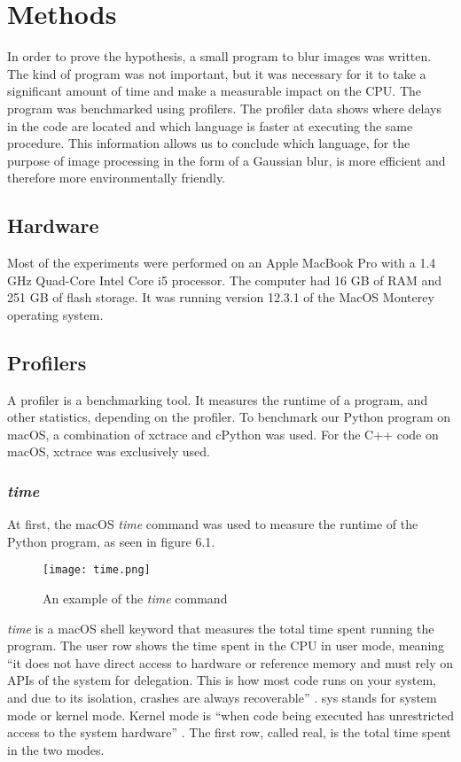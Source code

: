 \chapter{Methods}
In order to prove the hypothesis, a small program to blur images was written. The kind of program was not important, but it was necessary for it to take a significant amount of time and make a measurable impact on the CPU.
The program was benchmarked using profilers. The profiler data shows where delays in the code are located and which language is faster at executing the same procedure. This information allows us to conclude which language, for the purpose of image processing in the form of a Gaussian blur, is more efficient and therefore more environmentally friendly.

\section{Hardware}
Most of the experiments were performed on an Apple MacBook Pro with a 1.4 GHz Quad-Core Intel Core i5 processor. The computer had 16 GB of RAM and 251 GB of flash storage. It was running version 12.3.1 of the MacOS Monterey operating system.

\section{Profilers}
A profiler is a benchmarking tool. It measures the runtime of a program, and other statistics, depending on the profiler. To benchmark our Python program on macOS, a combination of xctrace and cPython was used. For the C++ code on macOS, xctrace was exclusively used.

\subsection{\textit{time}}
At first, the macOS \textit{time} command was used to measure the runtime of the Python program, as seen in figure 6.1.

\begin{figure}[htbp]
	\centering
	\texttt{[image: time.png]}
	\caption{An example of the \textit{time} command}
	\label{figure:time}
\end{figure}

\textit{time} is a macOS shell keyword that measures the total time spent running the program. The user row shows the time spent in the CPU in user mode, meaning “it does not have direct access to hardware or reference memory and must rely on APIs of the system for delegation. This is how most code runs on your system, and due to its isolation, crashes are always recoverable” \cite{time}. sys stands for system mode or kernel mode. Kernel mode is “when code being executed has unrestricted access to the system hardware” \cite{time}. The first row, called real, is the total time spent in the two modes.

